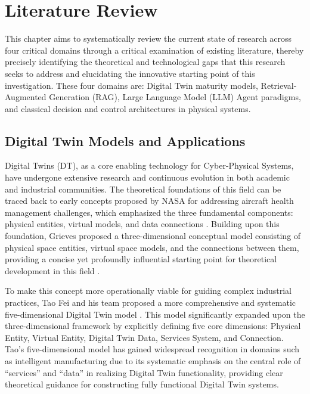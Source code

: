 
\chapter{Literature Review} \label{chp:literature}

This chapter aims to systematically review the current state of research across four critical domains through a critical examination of existing literature, thereby precisely identifying the theoretical and technological gaps that this research seeks to address and elucidating the innovative starting point of this investigation. These four domains are: Digital Twin maturity models, Retrieval-Augmented Generation (RAG), Large Language Model (LLM) Agent paradigms, and classical decision and control architectures in physical systems.

\section{Digital Twin Models and Applications}

Digital Twins (DT), as a core enabling technology for Cyber-Physical Systems, have undergone extensive research and continuous evolution in both academic and industrial communities. The theoretical foundations of this field can be traced back to early concepts proposed by NASA for addressing aircraft health management challenges, which emphasized the three fundamental components: physical entities, virtual models, and data connections \cite{glaessgen2012digital}. Building upon this foundation, Grieves proposed a three-dimensional conceptual model consisting of physical space entities, virtual space models, and the connections between them, providing a concise yet profoundly influential starting point for theoretical development in this field \cite{grieves2014digital}.

To make this concept more operationally viable for guiding complex industrial practices, Tao Fei and his team proposed a more comprehensive and systematic five-dimensional Digital Twin model \cite{tao2018digital}. This model significantly expanded upon the three-dimensional framework by explicitly defining five core dimensions: Physical Entity, Virtual Entity, Digital Twin Data, Services System, and Connection. Tao's five-dimensional model has gained widespread recognition in domains such as intelligent manufacturing due to its systematic emphasis on the central role of ``services'' and ``data'' in realizing Digital Twin functionality, providing clear theoretical guidance for constructing fully functional Digital Twin systems.

